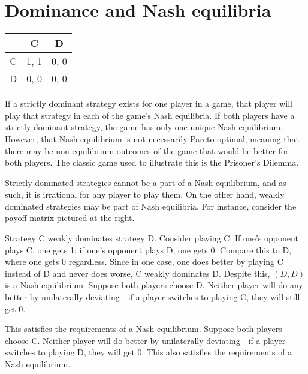 \documentclass[]{report}
\begin{document}
\section{Dominance and Nash equilibria}
\begin{tabular}{|c|c|c|} \hline
      &  C   &	D  \\ \hline
C     &	1, 1 & 	0, 0 \\ \hline
D     &	0, 0 &	0, 0 \\ \hline
\end{tabular}
If a strictly dominant strategy exists for one player in a game, that player will play that strategy in each of the game's Nash equilibria. If both players have a strictly dominant strategy, the game has only one unique Nash equilibrium. However, that Nash equilibrium is not necessarily Pareto optimal, meaning that there may be non-equilibrium outcomes of the game that would be better for both players. The classic game used to illustrate this is the Prisoner's Dilemma.

Strictly dominated strategies cannot be a part of a Nash equilibrium, and as such, it is irrational for any player to play them. On the other hand, weakly dominated strategies may be part of Nash equilibria. For instance, consider the payoff matrix pictured at the right.

Strategy C weakly dominates strategy D. Consider playing C: If one's opponent plays C, one gets 1; if one's opponent plays D, one gets 0. Compare this to D, where one gets 0 regardless. Since in one case, one does better by playing C instead of D and never does worse, C weakly dominates D. Despite this, ${\displaystyle (D,D)}$ is a Nash equilibrium. Suppose both players choose D. Neither player will do any better by unilaterally deviating—if a player switches to playing C, they will still get 0. 

This satisfies the requirements of a Nash equilibrium. Suppose both players choose C. Neither player will do better by unilaterally deviating—if a player switches to playing D, they will get 0. This also satisfies the requirements of a Nash equilibrium.
\end{document}
